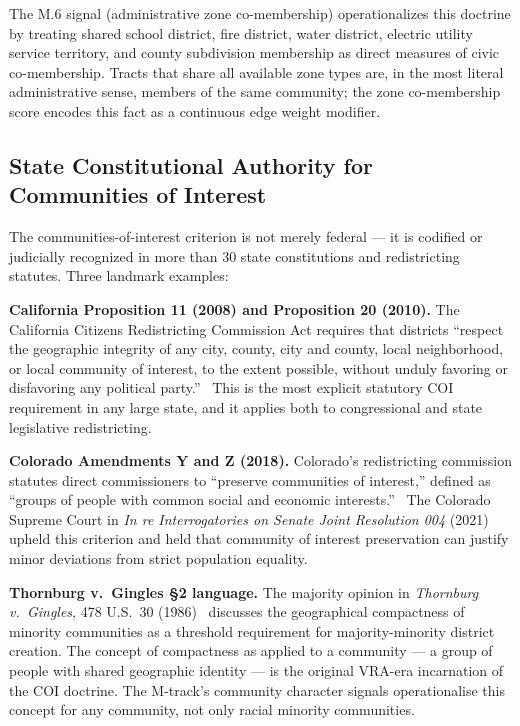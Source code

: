 The M.6 signal (administrative zone co-membership) operationalizes this doctrine
by treating shared school district, fire district, water district, electric utility
service territory, and county subdivision membership as direct measures of civic
co-membership.
Tracts that share all available zone types are, in the most literal administrative
sense, members of the same community; the zone co-membership score encodes this fact
as a continuous edge weight modifier.

\subsection{State Constitutional Authority for Communities of Interest}

The communities-of-interest criterion is not merely federal — it is codified or
judicially recognized in more than 30 state constitutions and redistricting statutes.
Three landmark examples:

\textbf{California Proposition 11 (2008) and Proposition 20 (2010).}
The California Citizens Redistricting Commission Act requires that districts
``respect the geographic integrity of any city, county, city and county, local
neighborhood, or local community of interest, to the extent possible, without
unduly favoring or disfavoring any political party.''~\citep{ca2010prop20}
This is the most explicit statutory COI requirement in any large state, and it
applies both to congressional and state legislative redistricting.

\textbf{Colorado Amendments Y and Z (2018).}
Colorado's redistricting commission statutes direct commissioners to ``preserve
communities of interest,'' defined as ``groups of people with common social and
economic interests.''~\citep{co2018amendments}
The Colorado Supreme Court in \textit{In re Interrogatories on Senate Joint
Resolution 004} (2021) upheld this criterion and held that community of interest
preservation can justify minor deviations from strict population equality.

\textbf{Thornburg v.\ Gingles §2 language.}
The majority opinion in \textit{Thornburg v.\ Gingles}, 478 U.S.\ 30 (1986)~\citep{gingles1986}
discusses the geographical compactness of minority communities as a threshold
requirement for majority-minority district creation.
The concept of compactness as applied to a community — a group of people with
shared geographic identity — is the original VRA-era incarnation of the COI doctrine.
The M-track's community character signals operationalise this concept for any
community, not only racial minority communities.

